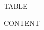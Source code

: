 \documentclass[10pt]{article}
\begin{document}
\clearpage
\pagestyle{empty}

\color{black!75}

\small

\begin{flushleft}


TABLE


CONTENT


\end{flushleft}
\end{document}
